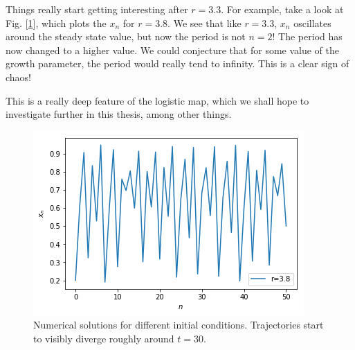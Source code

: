 Things really start getting interesting after $r=3.3$. For example, take a look at Fig. [\ref{fig:r38}], which plots the $x_n$ for $r=3.8$. We see that like $r=3.3$, $x_n$ oscillates around the steady state value, but now the period is not $n=2$! The period has now changed to a higher value. We could conjecture that for some value of the growth parameter, the period would really tend to infinity. This is a clear sign of chaos!

This is a really deep feature of the logistic map, which we shall hope to investigate further in this thesis, among other things.
\begin{figure}[h!]
	\centering
	\includegraphics[scale=0.8]{Figures/r38.png}
	\caption[An Electron]{Numerical solutions for different initial conditions. Trajectories start to visibly diverge roughly around $t=30$.}
	\label{fig:r38}
\end{figure}